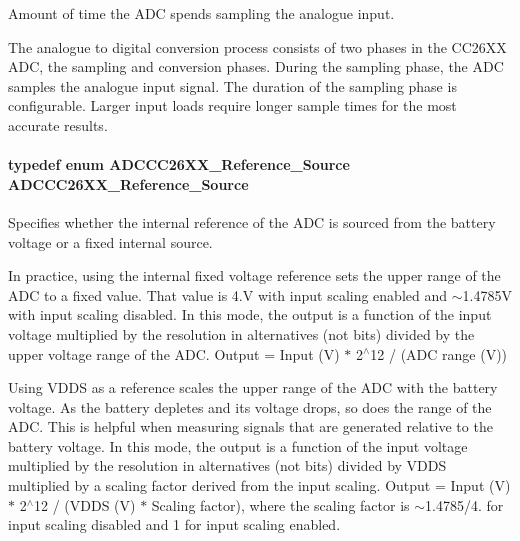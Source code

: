 Amount of time the A\+D\+C spends sampling the analogue input. 

The analogue to digital conversion process consists of two phases in the C\+C26\+X\+X A\+D\+C, the sampling and conversion phases. During the sampling phase, the A\+D\+C samples the analogue input signal. The duration of the sampling phase is configurable. Larger input loads require longer sample times for the most accurate results. 
\paragraph[{A\+D\+C\+C\+C26\+X\+X\+\_\+\+Reference\+\_\+\+Source}]{\setlength{\rightskip}{0pt plus 5cm}typedef enum {\bf A\+D\+C\+C\+C26\+X\+X\+\_\+\+Reference\+\_\+\+Source}  {\bf A\+D\+C\+C\+C26\+X\+X\+\_\+\+Reference\+\_\+\+Source}}\label{_a_d_c_c_c26_x_x_8h_a3690de700d303a304c078243b30df922}


Specifies whether the internal reference of the A\+D\+C is sourced from the battery voltage or a fixed internal source. 


\begin{DoxyItemize}
\item In practice, using the internal fixed voltage reference sets the upper range of the A\+D\+C to a fixed value. That value is 4.\+V with input scaling enabled and $\sim$1.4785\+V with input scaling disabled. In this mode, the output is a function of the input voltage multiplied by the resolution in alternatives (not bits) divided by the upper voltage range of the A\+D\+C. Output = Input (V) $\ast$ 2$^\wedge$12 / (A\+D\+C range (V))
\item Using V\+D\+D\+S as a reference scales the upper range of the A\+D\+C with the battery voltage. As the battery depletes and its voltage drops, so does the range of the A\+D\+C. This is helpful when measuring signals that are generated relative to the battery voltage. In this mode, the output is a function of the input voltage multiplied by the resolution in alternatives (not bits) divided by V\+D\+D\+S multiplied by a scaling factor derived from the input scaling. Output = Input (V) $\ast$ 2$^\wedge$12 / (V\+D\+D\+S (V) $\ast$ Scaling factor), where the scaling factor is $\sim$1.4785/4. for input scaling disabled and 1 for input scaling enabled.
\end{DoxyItemize}

